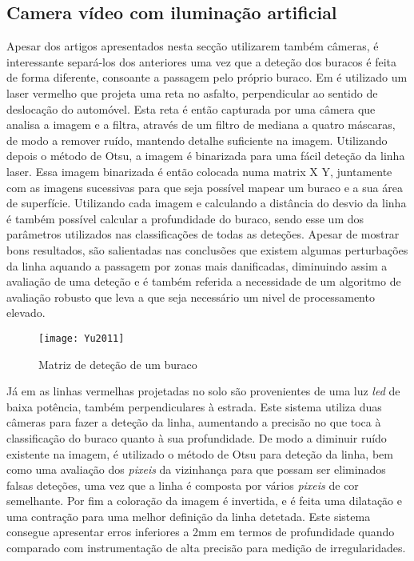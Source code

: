\subsection{Camera vídeo com iluminação artificial}
\label{subsec: camera_video_com_iluminacao_artificial}
Apesar dos artigos apresentados nesta secção utilizarem também câmeras, é interessante separá-los dos anteriores uma vez que a deteção dos buracos é feita de forma diferente, consoante a passagem pelo próprio buraco. Em \cite{Yu2011} é utilizado um laser vermelho que projeta uma reta no asfalto, perpendicular ao sentido de deslocação do automóvel. Esta reta é então capturada por uma câmera que analisa a imagem e a filtra, através de um filtro de mediana a quatro máscaras, de modo a remover ruído, mantendo detalhe suficiente na imagem.
Utilizando depois o método de Otsu, a imagem é binarizada para uma fácil deteção da linha laser.
Essa imagem binarizada é então colocada numa matrix X Y, juntamente com as imagens sucessivas para que seja possível mapear um buraco e a sua área de superfície.
Utilizando cada imagem e calculando a distância do desvio da linha é também possível calcular a profundidade do buraco, sendo esse um dos parâmetros utilizados nas classificações de todas as deteções.
Apesar de mostrar bons resultados, são salientadas nas conclusões que existem algumas perturbações da linha aquando a passagem por zonas mais danificadas, diminuindo assim a avaliação de uma deteção e é também referida a necessidade de um algoritmo de avaliação robusto que leva a que seja necessário um nivel de processamento elevado.

\begin{figure}[htbp]
	\centering
	\texttt{[image: Yu2011]}
	\caption[Matriz de deteção de um buraco]{Matriz de deteção de um buraco \footnotemark}
	\label{fig:sensor_kinect}
\end{figure}

Já em \cite{He2011} as linhas vermelhas projetadas no solo são provenientes de uma luz \emph{led} de baixa potência, também perpendiculares à estrada. Este sistema utiliza duas câmeras para fazer a deteção da linha, aumentando a precisão no que toca à classificação do buraco quanto à sua profundidade.
De modo a diminuir ruído existente na imagem, é utilizado o método de Otsu para deteção da linha, bem como uma avaliação dos \emph{pixeis} da vizinhança para que possam ser eliminados falsas deteções, uma vez que a linha é composta por vários \emph{pixeis} de cor semelhante.
Por fim a coloração da imagem é invertida, e é feita uma dilatação e uma contração para uma melhor definição da linha detetada.
Este sistema consegue apresentar erros inferiores a 2mm em termos de profundidade quando comparado com instrumentação de alta precisão para medição de irregularidades.

